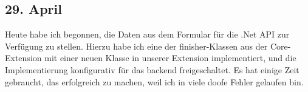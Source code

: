 \subsection{29. April}
Heute habe ich begonnen, die Daten aus dem Formular für die .Net API zur Verfügung zu stellen. Hierzu habe ich eine der finisher-Klassen aus der Core-Extension mit einer neuen Klasse in unserer Extension implementiert, und die Implementierung konfigurativ für das backend freigeschaltet. Es hat einige Zeit gebraucht, das erfolgreich zu machen, weil ich in viele doofe Fehler gelaufen bin.
